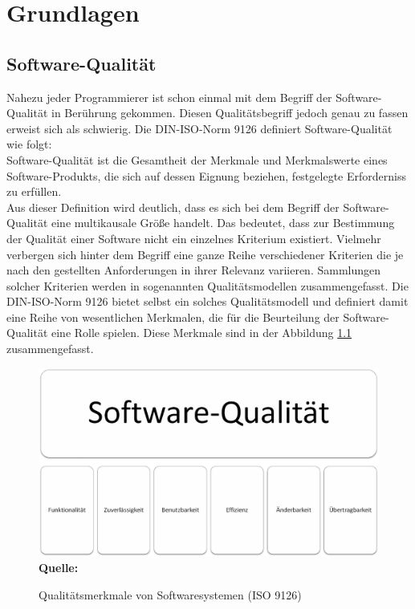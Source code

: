 \chapter{Grundlagen}
\label{sec:grundlagen}


\section{Software-Qualität}
\label{sec:softwarequalität}

Nahezu jeder Programmierer ist schon einmal mit dem Begriff der Software-Qualität in Berührung gekommen. Diesen Qualitätsbegriff jedoch genau zu fassen erweist sich als schwierig.
Die DIN-ISO-Norm 9126 definiert Software-Qualität wie folgt:
\\
\glqq Software-Qualität ist die Gesamtheit der Merkmale und Merkmalswerte eines Software-Produkts, die sich auf dessen Eignung beziehen, festgelegte Erforderniss zu erfüllen.\grqq \cite{iso/iec_iso/iec_2001}
\\
Aus dieser Definition wird deutlich, dass es sich bei dem Begriff der Software-Qualität eine multikausale Größe handelt. Das bedeutet, dass zur Bestimmung der Qualität einer Software nicht ein einzelnes Kriterium existiert. Vielmehr verbergen sich hinter dem Begriff eine ganze Reihe verschiedener Kriterien die je nach den gestellten Anforderungen in ihrer Relevanz variieren.\cite[vgl. Seite 6 ff.]{hoffmann_software-qualitat_2013}
Sammlungen solcher Kriterien werden in sogenannten Qualitätsmodellen zusammengefasst. Die DIN-ISO-Norm 9126 bietet selbst ein solches Qualitätsmodell und definiert damit eine Reihe von wesentlichen Merkmalen, die für die Beurteilung der Software-Qualität eine Rolle spielen. Diese Merkmale sind in der Abbildung \ref{fig:qualitaetsmerkmaleVonSoftwaresystemen} zusammengefasst.
\begin{figure}[htb]
  \centering  
  \includegraphics[scale=0.6]{img/softwarequalitaet9126.png}\\
  \footnotesize\sffamily\textbf{Quelle:} \cite{iso/iec_iso/iec_2001}
  \caption{Qualitätsmerkmale von Softwaresystemen (ISO 9126)}
  \label{fig:qualitaetsmerkmaleVonSoftwaresystemen}
\end{figure}
